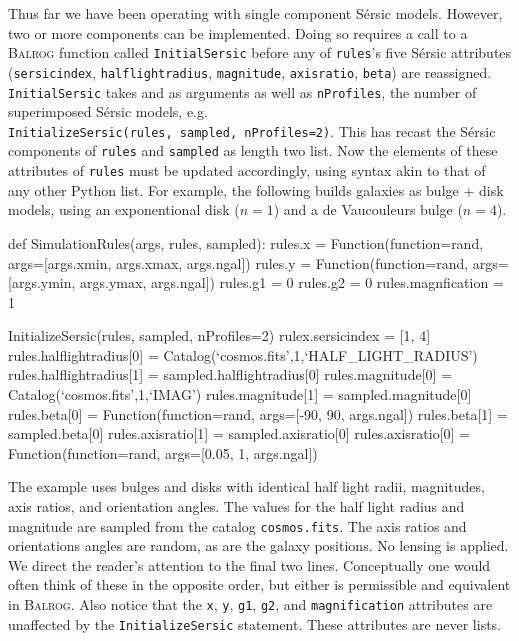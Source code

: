 \documentclass[12pt]{book}
\newcommand{\codett}[1]{\lstinline{#1}}
\newcommand{\py}{Python}
\newcommand{\balrog}{\textsc{Balrog}}
\newcommand{\sersic}{S\'{e}rsic}
\begin{document}
Thus far we have been operating with single component \sersic{} models.
However, two or more components can be implemented.
Doing so requires a call to a \balrog{} function called \codett{InitialSersic}
before any of \codett{rules}'s five \sersic{} attributes 
(\codett{sersicindex}, \codett{halflightradius}, \codett{magnitude}, \codett{axisratio}, \codett{beta})
are reassigned.
\codett{InitialSersic} takes \simrules{} and \simsamp{} as arguments as well as \codett{nProfiles},
the number of superimposed \sersic{} models, e.g.\\
\codett{InitializeSersic(rules, sampled, nProfiles=2)}.
This has recast the \sersic{} components of \codett{rules} and \codett{sampled} as length two list.
Now the elements of these attributes of \codett{rules} must be updated accordingly,
using syntax akin to that of any other \py{} list. For example, the following builds
galaxies as bulge + disk models, using an exponentional disk ($n = 1$) and a de Vaucouleurs bulge ($n = 4$).

\begin{code}
def SimulationRules(args, rules, sampled):
    rules.x = Function(function=rand, args=[args.xmin, args.xmax, args.ngal])
    rules.y = Function(function=rand, args=[args.ymin, args.ymax, args.ngal])
    rules.g1 = 0
    rules.g2 = 0
    rules.magnfication = 1

    InitializeSersic(rules, sampled, nProfiles=2)
    rulex.sersicindex = [1, 4]
    rules.halflightradius[0] = Catalog(`cosmos.fits',1,`HALF_LIGHT_RADIUS')
    rules.halflightradius[1] = sampled.halflightradius[0]
    rules.magnitude[0] = Catalog(`cosmos.fits',1,`IMAG')
    rules.magnitude[1] = sampled.magnitude[0]
    rules.beta[0] = Function(function=rand, args=[-90, 90, args.ngal])
    rules.beta[1] = sampled.beta[0]
    rules.axisratio[1] = sampled.axisratio[0]
    rules.axisratio[0] = Function(function=rand, args=[0.05, 1, args.ngal])
\end{code}

\noindent The example uses bulges and disks with identical half light radii,
magnitudes, axis ratios, and orientation angles.
The values for the half light radius and magnitude are sampled from the catalog \codett{cosmos.fits}.
The axis ratios and orientations angles are random, as are the galaxy positions.
No lensing is applied.
We direct the reader's attention to the final two lines.
Conceptually one would often think of these in the opposite order, but either is permissible 
and equivalent in \balrog{}.
Also notice that the \codett{x}, \codett{y}, \codett{g1}, \codett{g2}, and \codett{magnification}
attributes are unaffected by the \codett{InitializeSersic} statement. These attributes are never lists.
\end{document}
